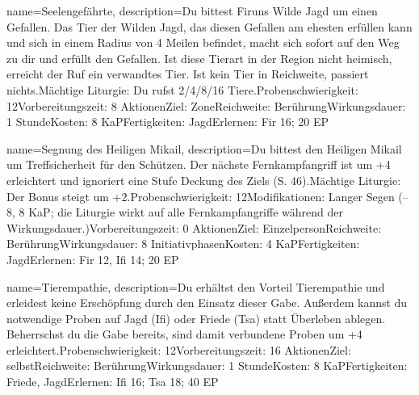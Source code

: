 {
    name={Seelengefährte},
    description={Du bittest Firuns Wilde Jagd um einen Gefallen. Das Tier der Wilden Jagd, das diesen Gefallen am ehesten erfüllen kann und sich in einem Radius von 4 Meilen befindet, macht sich sofort auf den Weg zu dir und erfüllt den Gefallen. Ist diese Tierart in der Region nicht heimisch, erreicht der Ruf ein verwandtes Tier. Ist kein Tier in Reichweite, passiert nichts.\newline Mächtige Liturgie: Du rufst 2/4/8/16 Tiere.\newline Probenschwierigkeit: 12\newline Vorbereitungszeit: 8 Aktionen\newline Ziel: Zone\newline Reichweite: Berührung\newline Wirkungsdauer: 1 Stunde\newline Kosten: 8 KaP\newline Fertigkeiten: Jagd\newline Erlernen: Fir 16; 20 EP}
}


{
    name={Segnung des Heiligen Mikail},
    description={Du bittest den Heiligen Mikail um Treffsicherheit für den Schützen. Der nächste Fernkampfangriff ist um +4 erleichtert und ignoriert eine Stufe Deckung des Ziels (S. 46).\newline Mächtige Liturgie: Der Bonus steigt um +2.\newline Probenschwierigkeit: 12\newline Modifikationen: Langer Segen (–8, 8 KaP; die Liturgie wirkt auf alle Fernkampfangriffe während der Wirkungsdauer.)\newline Vorbereitungszeit: 0 Aktionen\newline Ziel: Einzelperson\newline Reichweite: Berührung\newline Wirkungsdauer: 8 Initiativphasen\newline Kosten: 4 KaP\newline Fertigkeiten: Jagd\newline Erlernen: Fir 12, Ifi 14; 20 EP}
}


{
    name={Tierempathie},
    description={Du erhältst den Vorteil Tierempathie und erleidest keine Erschöpfung durch den Einsatz dieser Gabe. Außerdem kannst du notwendige Proben auf Jagd (Ifi) oder Friede (Tsa) statt Überleben ablegen. Beherrschst du die Gabe bereits, sind damit verbundene Proben um +4 erleichtert.\newline Probenschwierigkeit: 12\newline Vorbereitungszeit: 16 Aktionen\newline Ziel: selbst\newline Reichweite: Berührung\newline Wirkungsdauer: 1 Stunde\newline Kosten: 8 KaP\newline Fertigkeiten: Friede, Jagd\newline Erlernen: Ifi 16; Tsa 18; 40 EP}
}



